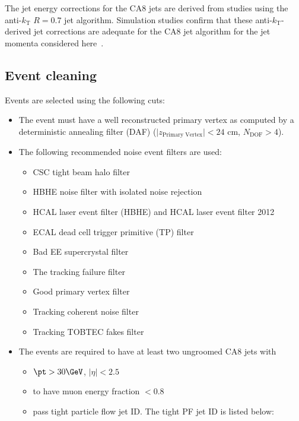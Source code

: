 The jet energy corrections for the CA8 jets are derived from studies using the
anti-$k_{\mathrm T}$ $R=0.7$ jet algorithm. Simulation studies confirm that these
anti-$k_{\mathrm T}$-derived jet corrections
are adequate for the CA8 jet algorithm for the jet momenta
considered here~\cite{topwtag_pas}.%


\subsection{Event cleaning}
\label{event_selection}

Events are selected using the following cuts:
\begin{itemize}
\item The event must have a well reconstructed primary vertex as computed by a deterministic annealing filter (DAF)
($\vert z_\text{Primary Vertex}\vert < 24$ cm, $N_\text{DOF} > 4$).
\item The following recommended noise event filters are used:
       \begin{itemize}
          \item  CSC tight beam halo filter
          \item  HBHE noise filter with isolated noise rejection
          \item  HCAL laser event filter (HBHE) and HCAL laser event filter 2012
          \item  ECAL dead cell trigger primitive (TP) filter
          \item  Bad EE supercrystal filter
          \item  The tracking failure filter
          \item  Good primary vertex filter 
	  \item  Tracking coherent noise filter
	  \item  Tracking TOBTEC fakes filter  
       \end{itemize}
\item The events are required to have at least two ungroomed CA8 jets with
        \begin{itemize}
          \item $\pt > 30 \GeVcc$, $|\eta| < 2.5$
          \item  to have muon energy fraction $< 0.8$
          \item pass tight particle flow jet ID. The tight PF jet ID is listed below:
                 \begin{itemize}

\end{itemize}
\end{itemize}
\end{itemize}
